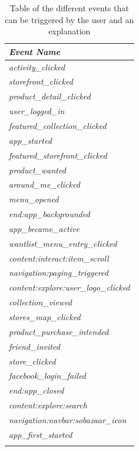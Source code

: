     \begin{table}[H]
        \centering
        \begin{tabular}{l}
            \toprule
            \emph{Event Name}   \\
            \midrule
            \emph{activity\_clicked}  \\
            \emph{storefront\_clicked}  \\
            \emph{product\_detail\_clicked}  \\
            \emph{user\_logged\_in}  \\
            \emph{featured\_collection\_clicked}  \\
            \emph{app\_started}  \\
            \emph{featured\_storefront\_clicked}  \\
            \emph{product\_wanted}  \\
            \emph{around\_me\_clicked}  \\
            \emph{menu\_opened}  \\
            \emph{end:app\_backgrounded}  \\
            \emph{app\_became\_active}  \\
            \emph{wantlist\_menu\_entry\_clicked}  \\
            \emph{content:interact:item\_scroll}  \\
            \emph{navigation:paging\_triggered}  \\
            \emph{content:explore:user\_logo\_clicked}  \\
            \emph{collection\_viewed}  \\
            \emph{stores\_map\_clicked}  \\
            \emph{product\_purchase\_intended}  \\
            \emph{friend\_invited}  \\
            \emph{store\_clicked}  \\
            \emph{facebook\_login\_failed}  \\
            \emph{end:app\_closed}  \\
            \emph{content:explore:search}  \\
            \emph{navigation:navbar:sobazaar\_icon}  \\
            \emph{app\_first\_started}  \\
            \bottomrule
        \caption[List of Different Events]{Table of the different events that can be triggered by the user and an explanation}
        \label{table:events}
        \end{tabular}
    \end{table}


